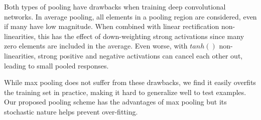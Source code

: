 \documentclass{article} %
\def\BE{\vspace{-0.0mm}\begin{equation}}
\def\EE{\vspace{-0.0mm}\end{equation}}
\begin{document}


Both types of pooling have drawbacks when training deep convolutional
networks. In average pooling, all elements in a pooling region are considered,
even if many have low magnitude. When combined with linear rectification
non-linearities, this has the effect of down-weighting strong
activations since many zero elements are included in the average.
Even worse, with $tanh()$ non-linearities, strong positive and negative activations
can cancel each other out, leading to small pooled responses.

While max pooling does not suffer from these drawbacks, we find it easily overfits the training set
in practice,
making it hard to generalize well to test examples. Our proposed pooling scheme has the
advantages of max pooling but its stochastic nature helps prevent
over-fitting.





\end{document}
